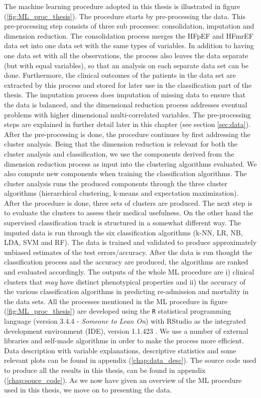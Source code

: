 \documentclass[../thesis.tex]{subfiles}
\begin{document}


\indent The machine learning procedure adopted in this thesis is illustrated in figure (\ref{fig:ML_proc_thesis}). The procedure starts by pre-processing the data. This pre-processing step consists of three sub processes: consolidation, imputation and dimension reduction. The consolidation process merges the HFpEF and HFmrEF data set into one data set with the same types of variables. In addition to having one data set with all the observations, the process also leaves the data separate (but with equal variables), so that an analysis on each separate data set can be done. Furthermore, the clinical outcomes of the patients in the data set are extracted by this process and stored for later use in the classification part of the thesis. The imputation process does imputation of missing data to ensure that the data is balanced, and the dimensional reduction process addresses eventual problems with higher dimensional multi-correlated variables. The pre-processing steps are explained in further detail later in this chapter (see section \ref{sec:data}). After the pre-processing is done, the procedure continues by first addressing the cluster analysis. Being that the dimension reduction is relevant for both the cluster analysis and classification, we use the components derived from the dimension reduction process as input into the clustering algorithms evaluated. We also compute new components when training the classification algorithms. The cluster analysis runs the produced components through the three cluster algorithms (hierarchical clustering, k-means and expectation maximization). After the procedure is done, three sets of clusters are produced. The next step is to evaluate the clusters to assess their medical usefulness. On the other hand the supervised classification track is structured in a somewhat different way. The imputed data is run through the six classification algorithms (k-NN, LR, NB, LDA, SVM and RF). The data is trained and validated to produce approximately unbiased estimates of the test errors/accuracy. After the data is run thought the classification process and the accuracy are produced, the algorithms are ranked and evaluated accordingly. The outputs of the whole ML procedure are i) clinical clusters that \textit{may} have distinct phenotypical properties and ii) the accuracy of the various classification algorithms in predicting re-admission and mortality in the data sets. All the processes mentioned in the ML procedure in figure (\ref{fig:ML_proc_thesis}) are developed using the \texttt{R} statistical programming language (version 3.4.4 - \textit{Someone to Lean On}) \citep{Rsoftware2018} with RStudio as the integrated development environment (IDE), version 1.1.423 \citep{RStudio2018}. We use a number of external libraries and self-made algorithms in order to make the process more efficient. Data description with variable explanations, descriptive statistics and some relevant plots can be found in appendix (\ref{chap:data_desc}). The source code used to produce all the results in this thesis, can be found in appendix (\ref{chap:souce_code}). As we now have given an overview of the ML procedure used in this thesis, we move on to presenting the data.
\end{document}
